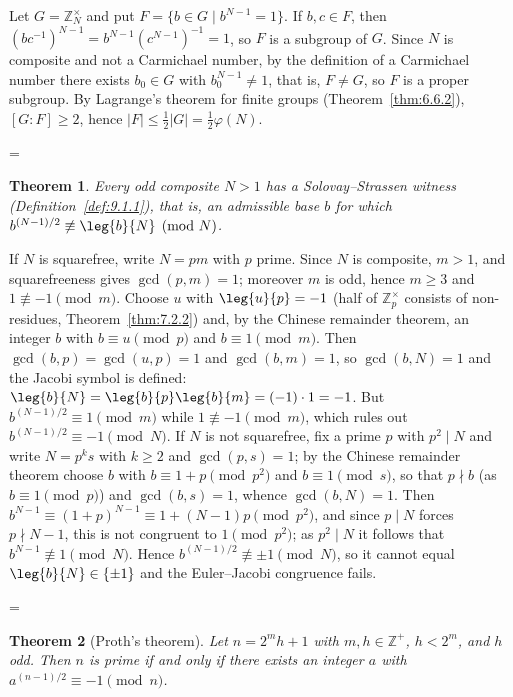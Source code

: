 \documentclass[11pt]{article}
\makeatletter
\theoremstyle{ntstyle}
\newtheorem{theorem}{Theorem}[subsection]
\let\nt@closedisplay\]
\def\nt@guardedclose{\@ifnextchar\par{\nt@closeafterpar}{\@ifnextchar\end{\postdisplaypenalty\@M\nt@closedisplay}{\nt@closedisplay}}}
\def\nt@closeafterpar\par{\@ifnextchar\par{\nt@closeafterpar}{\@ifnextchar\end{\postdisplaypenalty\@M\nt@closedisplay\par}{\nt@closedisplay\par}}}
\renewenvironment{proof}[1][\proofname]{\par
  \pushQED{\qed}\normalfont\topsep\medskipamount\edef\nt@afterproof{\@endparpenalty=\the\@endparpenalty\relax}\@beginparpenalty\@M\@endparpenalty\@M\let\]\nt@guardedclose\trivlist\item[]\textit{#1\@addpunct{.}} \ignorespaces}{\ifvmode\addpenalty\@M\fi\popQED\nt@afterproof\endtrivlist\@endpefalse}
\newcommand{\ZmodUnits}[1]{\mathbb{Z}_{#1}^{\times}}
\makeatother
\begin{document}
\begin{proof} Let $G=\ZmodUnits{N}$ and put
	$F=\{b\in G \mid b^{N-1}=1\}$. If $b,c\in F$, then
	$(bc^{-1})^{N-1}=b^{N-1}(c^{N-1})^{-1}=1$, so $F$ is a subgroup of $G$. Since
	$N$ is composite and not a Carmichael number, by the definition of a
	Carmichael number there exists $b_0\in G$ with $b_0^{N-1}\neq 1$, that is,
	$F\neq G$, so $F$ is a proper subgroup. By Lagrange's theorem for finite groups (Theorem~\ref{thm:6.6.2}), $[G:F]\ge 2$, hence
	$|F|\le\frac12|G|=\frac12\varphi(N)$.

\end{proof}
\begin{theorem}\label{thm:9.1.5} Every odd composite $N>1$ has a Solovay--Strassen witness
	(Definition~\ref{def:9.1.1}), that is, an admissible base $b$ for which
	$b^{(N-1)/2}\not\equiv\leg{b}{N}\pmod{N}$.

\end{theorem}

\begin{proof} If $N$ is squarefree, write $N=pm$ with $p$
	prime. Since $N$ is composite, $m>1$, and squarefreeness gives $\gcd(p,
		m)=1$; moreover $m$ is odd, hence $m\ge3$ and $1\not\equiv-1\pmod{m}$.
	Choose $u$ with $\leg{u}{p}=-1$ (half of $\ZmodUnits{p}$ consists
	of non-residues, Theorem~\ref{thm:7.2.2}) and, by the Chinese remainder theorem, an
	integer $b$ with $b\equiv u\pmod{p}$ and $b\equiv1\pmod{m}$. Then
	$\gcd(b, p)=\gcd(u, p)=1$ and $\gcd(b, m)=1$, so $\gcd(b, N)=1$ and the
	Jacobi symbol is defined:
	$\leg{b}{N}=\leg{b}{p}\leg{b}{m}=(-1)\cdot1=-1$. But
	$b^{(N-1)/2}\equiv1\pmod{m}$ while $1\not\equiv-1\pmod{m}$, which rules
	out $b^{(N-1)/2}\equiv-1\pmod{N}$. If $N$ is not squarefree, fix a prime $p$ with $p^{2}\mid N$ and write $N=p^{k}s$ with $k\ge2$ and $\gcd(p, s)=1$; by the Chinese remainder theorem choose $b$ with $b\equiv1+p\pmod{p^{2}}$ and $b\equiv1\pmod{s}$, so that $p\nmid b$ (as $b\equiv1\pmod{p}$) and $\gcd(b, s)=1$, whence $\gcd(b, N)=1$. Then $b^{N-1}\equiv(1+p)^{N-1}\equiv1+(N-1)p\pmod{p^{2}}$, and since $p\mid N$ forces $p\nmid N-1$, this is not congruent to $1\pmod{p^{2}}$; as $p^{2}\mid N$ it follows that $b^{N-1}\not\equiv1\pmod{N}$. Hence $b^{(N-1)/2}\not\equiv\pm1\pmod{N}$, so it cannot equal $\leg{b}{N}\in\{\pm1\}$ and the Euler--Jacobi congruence fails.

\end{proof}
\begin{theorem}[Proth's theorem]\label{thm:9.1.6} Let $n=2^{m}h+1$
	with $m,h\in\mathbb{Z}^+$, $h<2^{m}$, and $h$ odd. Then $n$ is prime if and only if
	there exists an integer $a$ with $a^{(n-1)/2}\equiv-1\pmod{n}$.

\end{theorem}
\end{document}
